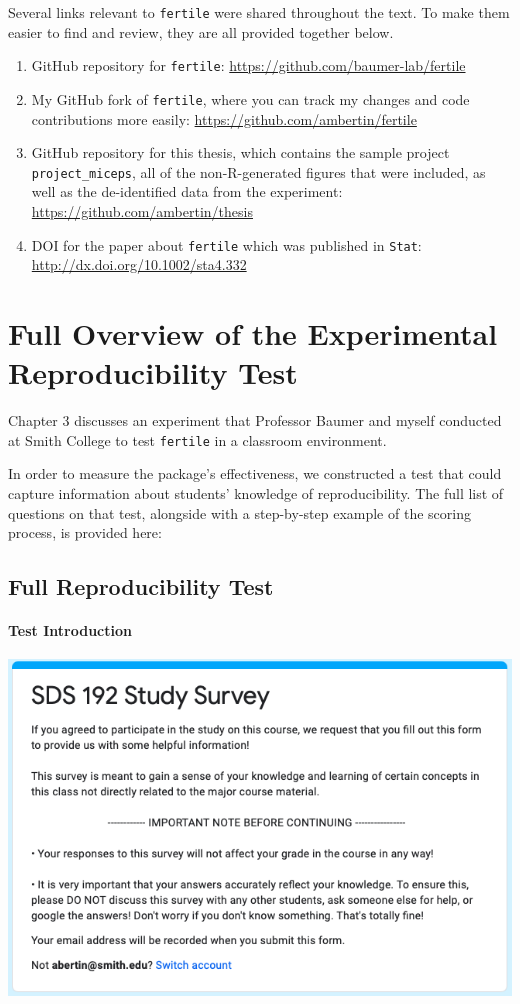 \documentclass[12pt,twoside]{reedthesis}
\begin{document}
Several links relevant to \texttt{fertile} were shared throughout the text. To make them easier to find and review, they are all provided together below.
\begin{enumerate}
\def\labelenumi{\arabic{enumi}.}
\item
  GitHub repository for \texttt{fertile}: \url{https://github.com/baumer-lab/fertile}
\item
  My GitHub fork of \texttt{fertile}, where you can track my changes and code contributions more easily: \url{https://github.com/ambertin/fertile}
\item
  GitHub repository for this thesis, which contains the sample project \texttt{project\_miceps}, all of the non-R-generated figures that were included, as well as the de-identified data from the experiment: \url{https://github.com/ambertin/thesis}
\item
  DOI for the paper about \texttt{fertile} which was published in \texttt{Stat}: \url{http://dx.doi.org/10.1002/sta4.332}
\end{enumerate}
\hypertarget{full-overview-of-the-experimental-reproducibility-test}{%
\chapter{Full Overview of the Experimental Reproducibility Test}\label{full-overview-of-the-experimental-reproducibility-test}}

Chapter 3 discusses an experiment that Professor Baumer and myself conducted at Smith College to test \texttt{fertile} in a classroom environment.

In order to measure the package's effectiveness, we constructed a test that could capture information about students' knowledge of reproducibility. The full list of questions on that test, alongside with a step-by-step example of the scoring process, is provided here:

\hypertarget{full-reproducibility-test}{%
\section{Full Reproducibility Test}\label{full-reproducibility-test}}

\hypertarget{test-introduction}{%
\subsubsection{Test Introduction}\label{test-introduction}}

\includegraphics[width=0.8\linewidth]{figure/appendix/test-intro}
\end{document}
